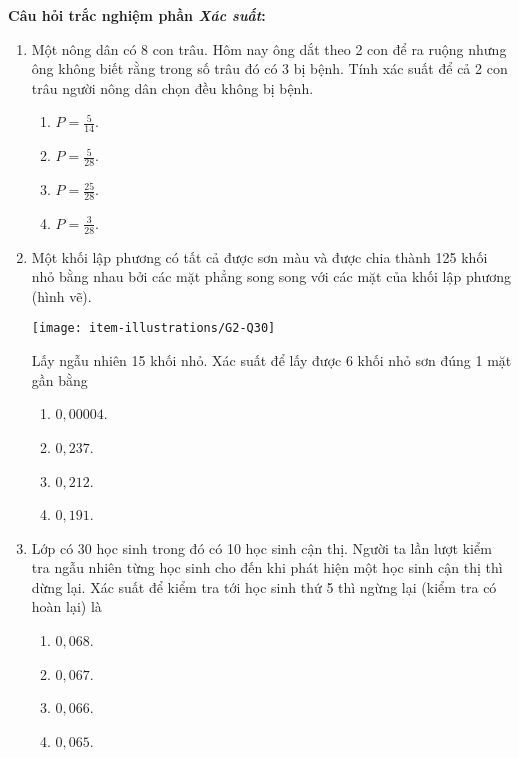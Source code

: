 \noindent\textbf{Câu hỏi trắc nghiệm phần \textit{Xác suất}:}
\begin{enumerate}[label=\textbf{Câu \arabic*.},align=left,left=0cm..0cm,itemindent=*]
	\item Một nông dân có 8 con trâu. Hôm nay ông dắt theo 2 con để ra ruộng nhưng ông không biết rằng trong số trâu đó có 3 bị bệnh. Tính xác suất để cả 2 con trâu người nông dân chọn đều không bị bệnh.
	\begin{multicols}{4}\begin{enumerate}[label=\textbf{\Alph*.},align=left,left=1cm..0cm,itemindent=*]
		\item $P=\frac 5{14}$. \item $P=\frac 5{28}$. \item $P=\frac{25}{28}$. \item $P=\frac 3{28}$.
	\end{enumerate}\end{multicols}
	\item Một khối lập phương có tất cả được sơn màu và được chia thành 125 khối nhỏ bằng nhau bởi các mặt phẳng song song với các mặt của khối lập phương (hình vẽ).\par
	{\centering\texttt{[image: item-illustrations/G2-Q30]}\par}
	Lấy ngẫu nhiên 15 khối nhỏ. Xác suất để lấy được 6 khối nhỏ sơn đúng 1 mặt gần bằng
	\begin{multicols}{4}\begin{enumerate}[label=\textbf{\Alph*.},align=left,left=1cm..0cm,itemindent=*]
		\item $0,00004$. \item $0,237$. \item $0,212$. \item $0,191$.
	\end{enumerate}\end{multicols}
	\item Lớp có 30 học sinh trong đó có 10 học sinh cận thị. Người ta lần lượt kiểm tra ngẫu nhiên từng học sinh cho đến khi phát hiện một học sinh cận thị thì dừng lại. Xác suất để kiểm tra tới học sinh thứ 5 thì ngừng lại (kiểm tra có hoàn lại) là
	\begin{multicols}{4}\begin{enumerate}[label=\textbf{\Alph*.},align=left,left=1cm..0cm,itemindent=*]
		\item $0,068$. \item $0,067$. \item $0,066$. \item $0,065$.

\end{enumerate}
\end{multicols}
\end{enumerate}
